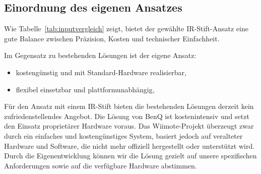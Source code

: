 \subsection{Einordnung des eigenen Ansatzes}

Wie Tabelle~\ref{tab:inputvergleich} zeigt, bietet der gewählte IR-Stift-Ansatz eine gute Balance zwischen Präzision, Kosten und technischer Einfachheit.

Im Gegensatz zu bestehenden Lösungen ist der eigene Ansatz:
\begin{itemize}
  \item kostengünstig und mit Standard-Hardware realisierbar,
  \item flexibel einsetzbar und plattformunabhängig,
\end{itemize}

Für den Ansatz mit einem IR-Stift bieten die bestehenden Lösungen derzeit kein zufriedenstellendes Angebot. Die Lösung von BenQ ist kostenintensiv und setzt den Einsatz proprietärer Hardware voraus. Das Wiimote-Projekt überzeugt zwar durch ein einfaches und kostengünstiges System, basiert jedoch auf veralteter Hardware und Software, die nicht mehr offiziell hergestellt oder unterstützt wird. Durch die Eigenentwicklung können wir die Lösung gezielt auf unsere spezifischen Anforderungen sowie auf die verfügbare Hardware abstimmen.